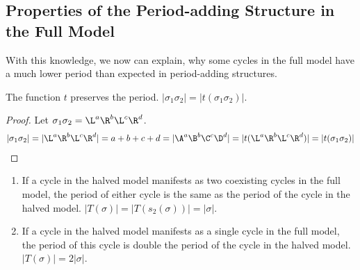\subsection{Properties of the Period-adding Structure in the Full Model}

With this knowledge, we now can explain, why some cycles in the full model have a much lower period than expected in period-adding structures.

\begin{lemma}
	\label{lemma:t.preserves.period}
	The function $t$ preserves the period. $|\sigma_1\sigma_2| = |t(\sigma_1\sigma_2)|$.
\end{lemma}

\begin{proof}
	Let $\sigma_1\sigma_2 = \L^a\R^b\L^c\R^d$.
	\begin{align*}
		|\sigma_1\sigma_2| =  |\L^a\R^b\L^c\R^d|
		= a + b + c + d
		= |\A^a\B^b\C^c\D^d|
		= |t(\L^a\R^b\L^c\R^d)|
		= |t(\sigma_1\sigma_2)|
	\end{align*}
\end{proof}

\begin{theorem}
	\begin{enumerate}
		\item If a cycle in the halved model manifests as two coexisting cycles in the full model, the period of either cycle is the same as the period of the cycle in the halved model. $|T(\sigma)| = |T(s_2(\sigma))| = |\sigma|$.
		\item If a cycle in the halved model manifests as a single cycle in the full model, the period of this cycle is double the period of the cycle in the halved model. $|T(\sigma)| = 2 |\sigma|$.
	\end{enumerate}
\end{theorem}

